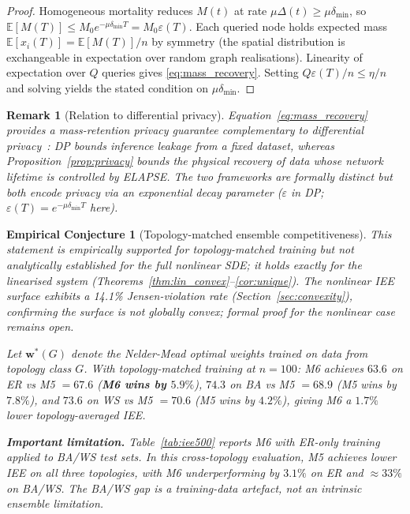 \documentclass[review,12pt]{elsarticle}
\newcommand{\bfw}{\mathbf{w}}
\newtheorem{conjecture}{Empirical Conjecture}
\newtheorem{remark}{Remark}
\begin{document}
\begin{proof}
Homogeneous mortality reduces $M(t)$ at rate $\mu\Delta(t) \geq \mu\delta_{\min}$,
so $\mathbb{E}[M(T)] \leq M_0 e^{-\mu\delta_{\min}T} = M_0\varepsilon(T)$.
Each queried node holds expected mass $\mathbb{E}[x_i(T)] = \mathbb{E}[M(T)]/n$
by symmetry (the spatial distribution is exchangeable in expectation over
random graph realisations).  Linearity of expectation over $Q$ queries
gives \eqref{eq:mass_recovery}.  Setting $Q\varepsilon(T)/n \leq \eta/n$
and solving yields the stated condition on $\mu\delta_{\min}$.
\end{proof}

\begin{remark}[Relation to differential privacy]
\label{rem:dp}
Equation~\eqref{eq:mass_recovery} provides a \emph{mass-retention} privacy
guarantee complementary to differential privacy~\cite{dwork2014algorithmic}:
DP bounds inference leakage from a fixed dataset, whereas
Proposition~\ref{prop:privacy} bounds the \emph{physical recovery} of data
whose network lifetime is controlled by ELAPSE.  The two frameworks are
formally distinct but both encode privacy via an exponential decay parameter
($\varepsilon$ in DP; $\varepsilon(T)=e^{-\mu\delta_{\min}T}$ here).
\end{remark}

\begin{conjecture}[Topology-matched ensemble competitiveness]
\label{prop:dominance}
\emph{This statement is empirically supported for topology-matched training
but not analytically established for the full nonlinear SDE; it holds exactly
for the linearised system (Theorems~\ref{thm:lin_convex}--\ref{cor:unique}).
The nonlinear IEE surface exhibits a 14.1\% Jensen-violation rate
(Section~\ref{sec:convexity}), confirming the surface is not globally
convex; formal proof for the nonlinear case remains open.}

Let $\bfw^*(G)$ denote the Nelder-Mead optimal weights \emph{trained on data
from topology class $G$}.  With topology-matched training at $n=100$:
M6 achieves $63.6$ on ER vs M5 $=67.6$ (\textbf{M6 wins by $5.9\%$}), $74.3$
on BA vs M5 $=68.9$ (M5 wins by $7.8\%$), and $73.6$ on WS vs M5 $=70.6$
(M5 wins by $4.2\%$), giving M6 a $1.7\%$ lower topology-averaged IEE.

\textbf{Important limitation.}  Table~\ref{tab:iee500} reports M6 with
\emph{ER-only} training applied to BA/WS test sets.  In this
cross-topology evaluation, M5 achieves lower IEE on all three topologies,
with M6 underperforming by $3.1\%$ on ER and $\approx 33\%$ on BA/WS.
The BA/WS gap is a training-data artefact, not an intrinsic ensemble limitation.
\end{conjecture}
\end{document}
